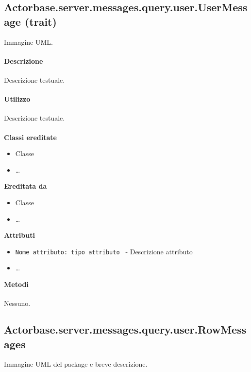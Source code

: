 \documentclass[a4paper]{article}
\begin{document}
	\subsection{Actorbase.server.messages.query.user.UserMessage (trait)}
		Immagine UML.
		\\ \\
		\textbf{Descrizione}
			\\ \\
			Descrizione testuale.
			\\ \\
		\textbf{Utilizzo}
			\\ \\
			Descrizione testuale.
			\\ \\
		\textbf{Classi ereditate}
			\begin{itemize}
				\item Classe
				\item \dots
			\end{itemize}
		\textbf{Ereditata da}
			\begin{itemize}
				\item Classe
				\item \dots
			\end{itemize}
		\textbf{Attributi}
			\begin{itemize}
				\item \texttt{Nome attributo: tipo attributo } - Descrizione attributo
				\item \dots
			\end{itemize}
		\textbf{Metodi}
			\\ \\
			Nessuno.	
			
	\subsection{Actorbase.server.messages.query.user.RowMessages}
		Immagine UML del package e breve descrizione.
		
\end{document}
